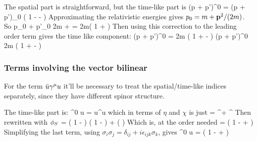 The spatial part is straightforward, but the time-like part is 
\beq
	(p + p')^0 \srb \sr  = (p + p')_0 \wxd \left( 
		1 -   -  
		\right ) \wx
\eeq
Approximating the relativistic energies gives $p_0 = m + \mathbf{p}^2 / (2m) $.  So
\beq
	p_0 + p'_0 \approx 2m +  = 2m\left( 1 +   \right )
\eeq
Then using this correction to the leading order term gives the time like component:
\beq
	(p + p')^0 \srb \sr  = 2m  \wxd \left( 
		1 +   -  
		\right ) \wx
\eeq
\beq \label{eq:Sh:S0}
	(p + p')^0 \srb \sr  \approx 2m  \wxd \left( 
		1 +   -  
		\right ) \wx
\eeq




\subsubsection{Terms involving the vector bilinear}
For the term $\bar{u} \gamma^\mu u$ it'll be necessary to treat the spatial/time-like indices separately, since they have different spinor structure.

The time-like part is:
\beq
	\srb \gamma^0 u = u^\dagger u
\eeq
which in terms of $\eta$ and $\chi$ is just
\beq
	= \eta^\dagger \eta + \chi^\dagger \chi 
\eeq
Then rewritten with $\phi_S$
\beq
	= 	\wxd \left( 1 -  \right )  \left( 1 -  \right ) \wx
		+ \wxd \left(   \right ) \wx 
\eeq
Which is, at the order needed
\beq
	=	 \wxd \left( 
		1 -   +  
		\right ) \wx
\eeq
Simplifying the last term, using $\sigma_i \sigma_j = \delta_{ij} + i\epsilon_{ijk}\sigma_k$, gives
\beq \label{eq:Sh:V0}
	\srb \gamma^0 u = 
			\wxd \left( 
		1 -   +  
		\right ) \wx
\eeq





